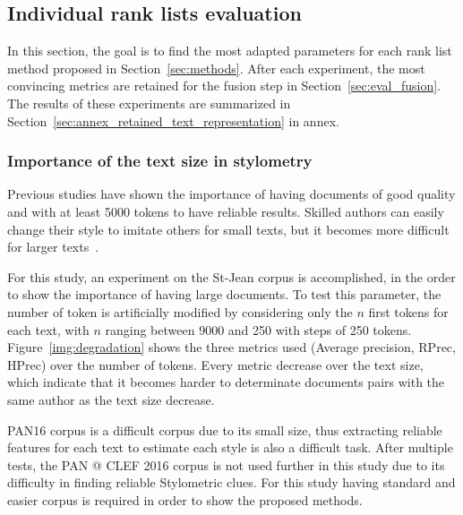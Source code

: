 \subsection{Individual rank lists evaluation \label{sec:eval_rl}}

In this section, the goal is to find the most adapted parameters for each rank list method proposed in Section~\ref{sec:methods}.
After each experiment, the most convincing metrics are retained for the fusion step in Section~\ref{sec:eval_fusion}.
The results of these experiments are summarized in Section~\ref{sec:annex_retained_text_representation} in annex.

\subsubsection{Importance of the text size in stylometry}

Previous studies have shown the importance of having documents of good quality and with at least 5000 tokens to have reliable results.
Skilled authors can easily change their style to imitate others for small texts, but it becomes more difficult for larger texts~\cite{savoy_stylo}.

For this study, an experiment on the St-Jean corpus is accomplished, in the order to show the importance of having large documents.
To test this parameter, the number of token is artificially modified by considering only the $n$ first tokens for each text, with $n$ ranging between 9000 and 250 with steps of 250 tokens.
Figure~\ref{img:degradation} shows the three metrics used (Average precision, RPrec, HPrec) over the number of tokens.
Every metric decrease over the text size, which indicate that it becomes harder to determinate documents pairs with the same author as the text size decrease.

PAN16 corpus is a difficult corpus due to its small size, thus extracting reliable features for each text to estimate each style is also a difficult task.
After multiple tests, the PAN @ CLEF 2016 corpus is not used further in this study due to its difficulty in finding reliable Stylometric clues.
For this study having standard and easier corpus is required in order to show the proposed methods.

